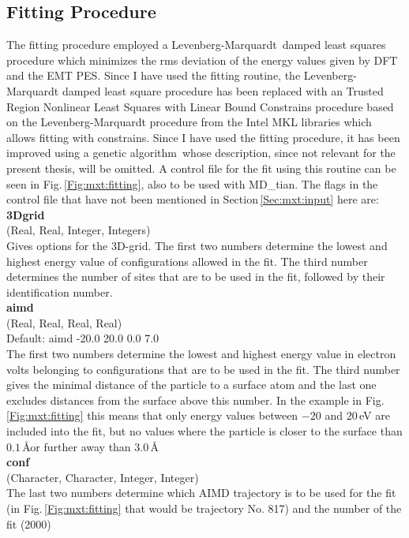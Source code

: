 \documentclass[twoside, 11pt, titlepage, captions=nooneline, a4paper, headsepline]{scrbook}%
\newcommand{\9}{\mathrm}
\newcommand{\0}{\,\mathrm}
\begin{document}
\subsection{Fitting Procedure}
The fitting procedure employed a Levenberg-Marquardt\,\cite{Levenberg1944,Marquardt1963} damped least squares procedure which minimizes the rms deviation of the energy values given by DFT and the EMT PES. Since I have used the fitting routine, the Levenberg-Marquardt damped least square procedure has been replaced with an Trusted Region Nonlinear Least Squares with Linear Bound Constrains procedure based on the Levenberg-Marquardt procedure from the Intel MKL libraries which allows fitting with constrains. Since I have used the fitting procedure, it has been improved using a genetic algorithm\,\cite{marvinmaster,marvinpc} whose description, since not relevant for the present thesis, will be omitted. A control file for the fit using this routine can be seen in Fig.\,\ref{Fig:mxt:fitting}, also to be used with MD\_tian. The flags in the control file that have not been mentioned in Section\,\ref{Sec:mxt:input} here are:\\

\noindent\textbf{3Dgrid}\\
(Real, Real, Integer, Integers)\\
Gives options for the 3D-grid. The first two numbers determine the lowest and highest energy value of configurations allowed in the fit. The third number determines the number of sites that are to be used in the fit, followed by their identification number.\\

\noindent\textbf{aimd}\\
(Real, Real, Real, Real)\\ 
Default: aimd -20.0 20.0 0.0 7.0\\
The first two numbers determine the lowest and highest energy value in electron volts belonging to configurations that are to be used in the fit. The third number gives the minimal distance of the particle to a surface atom and the last one excludes distances from the surface above this number. In the example in Fig.\,\ref{Fig:mxt:fitting} this means that only energy values between $-20$ and $20$\,eV are included into the fit, but no values where the particle is closer to the surface than $0.1$\,\AA or further away than $3.0$\,\AA\\

\noindent\textbf{conf}\\
(Character, Character, Integer, Integer)\\ 
The last two numbers determine which AIMD trajectory is to be used for the fit (in Fig.\,\ref{Fig:mxt:fitting} that would be trajectory No. 817) and the number of the fit (2000)\\
\end{document}
